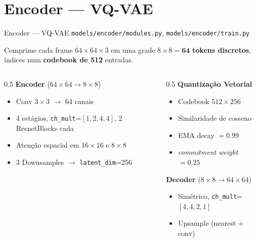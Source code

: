 \documentclass[11pt,aspectratio=169]{beamer}
\begin{document}
\section{Encoder --- VQ-VAE}

\begin{frame}{Encoder --- VQ-VAE}
  \small\texttt{models/encoder/modules.py}, \texttt{models/encoder/train.py}
  \medskip

  Comprime cada frame $64{\times}64{\times}3$ em uma grade
  $8{\times}8 = \mathbf{64}$ \textbf{tokens discretos}, índices num
  \textbf{codebook de 512} entradas.

  \bigskip
  \begin{columns}[T]
    \begin{column}{0.5\textwidth}
      \textbf{Encoder} ($64{\times}64 \to 8{\times}8$)
      \begin{itemize}\small
        \item Conv $3{\times}3$ $\to$ 64 canais
        \item 4 estágios, \texttt{ch\_mult}=$[1,2,4,4]$, 2 ResnetBlocks cada
        \item Atenção espacial em $16{\times}16$ e $8{\times}8$
        \item 3 Downsamples $\to$ \texttt{latent\_dim}=256
      \end{itemize}
    \end{column}
    \begin{column}{0.5\textwidth}
      \textbf{Quantização Vetorial}
      \begin{itemize}\small
        \item Codebook $512 \times 256$
        \item Similaridade de cosseno
        \item EMA decay $=0.99$
        \item \emph{commitment weight} $=0.25$
      \end{itemize}
      \medskip
      \textbf{Decoder} ($8{\times}8 \to 64{\times}64$)
      \begin{itemize}\small
        \item Simétrico, \texttt{ch\_mult}=$[4,4,2,1]$
        \item Upsample (nearest + conv)
      \end{itemize}
    \end{column}
  \end{columns}
\end{frame}
\end{document}
